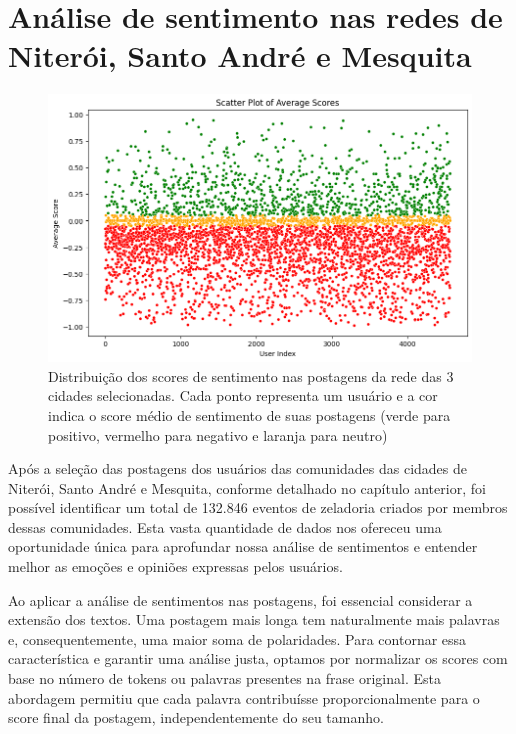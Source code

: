 \section{Análise de sentimento nas redes de Niterói, Santo André e Mesquita}

\begin{figure}[!htb]
	\caption{Distribuição dos scores de sentimento nas postagens da rede das 3 cidades selecionadas. Cada ponto representa um usuário e a cor indica o score médio de sentimento de suas postagens (verde para positivo, vermelho para negativo e laranja para neutro)}
	\label{fig:scores_scatterplot}
	\centering
	\includegraphics[scale=0.70]{images/scores_scatterplot.png}
	\fautor
\end{figure}

Após a seleção das postagens dos usuários das comunidades das cidades de Niterói, Santo André e Mesquita, conforme detalhado no capítulo anterior, foi possível identificar um total de 132.846 eventos de zeladoria criados por membros dessas comunidades. Esta vasta quantidade de dados nos ofereceu uma oportunidade única para aprofundar nossa análise de sentimentos e entender melhor as emoções e opiniões expressas pelos usuários.

Ao aplicar a análise de sentimentos nas postagens, foi essencial considerar a extensão dos textos. Uma postagem mais longa tem naturalmente mais palavras e, consequentemente, uma maior soma de polaridades. Para contornar essa característica e garantir uma análise justa, optamos por normalizar os scores com base no número de tokens ou palavras presentes na frase original. Esta abordagem permitiu que cada palavra contribuísse proporcionalmente para o score final da postagem, independentemente do seu tamanho.

